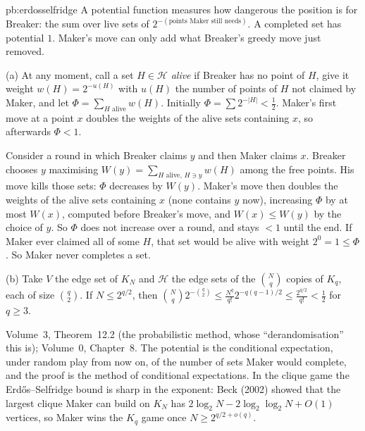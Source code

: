 \begin{solution}{pb:erdosselfridge}
\idea A potential function measures how dangerous the position is for Breaker: the sum over live sets of $2^{-(\text{points Maker still
needs})}$. A completed set has potential $1$. Maker's move can only add what Breaker's greedy move just removed.

\writeup (a) At any moment, call a set $H\in\mathcal H$ \emph{alive} if Breaker has no point of $H$, give it weight $w(H)=2^{-u(H)}$ with $u(H)$ the number of
points of $H$ not claimed by Maker, and let $\Phi=\sum_{H\text{ alive}}w(H)$. Initially $\Phi=\sum2^{-|H|}<\frac12$. Maker's first move at a point $x$ doubles the
weights of the alive sets containing $x$, so afterwards $\Phi<1$.

Consider a round in which Breaker claims $y$ and then Maker claims $x$. Breaker chooses $y$ maximising $W(y)=\sum_{H\text{ alive},\,H\ni y}w(H)$ among
the free points. His move kills those sets: $\Phi$ decreases by $W(y)$. Maker's move then doubles the weights of the alive sets containing
$x$ (none contains $y$ now), increasing $\Phi$ by at most $W(x)$, computed before Breaker's move, and $W(x)\le W(y)$ by the choice of $y$. So $\Phi$
does not increase over a round, and stays $<1$ until the end. If Maker ever claimed all of some $H$, that set would be alive with
weight $2^0=1\le\Phi$. So Maker never completes a set.

(b) Take $V$ the edge set of $K_N$ and $\mathcal H$ the edge sets of the $\binom Nq$ copies of $K_q$, each of size $\binom q2$. If $N\le2^{q/2}$, then
$\binom Nq2^{-\binom q2}\le\frac{N^q}{q!}2^{-q(q-1)/2}\le\frac{2^{q/2}}{q!}<\frac12$ for $q\ge3$.

\tools Volume~3, Theorem~12.2 (the probabilistic method, whose ``derandomisation'' this is); Volume~0, Chapter~8.
\leads The potential is the conditional expectation, under random play from now on, of the number of sets Maker would complete,
and the proof is the method of conditional expectations. In the clique game the Erd\H os--Selfridge bound is sharp in the exponent: Beck (2002) showed that the largest clique Maker can
build on $K_N$ has $2\log_2N-2\log_2\log_2N+O(1)$ vertices, so Maker wins the $K_q$ game once $N\ge2^{q/2+o(q)}$.
\end{solution}


